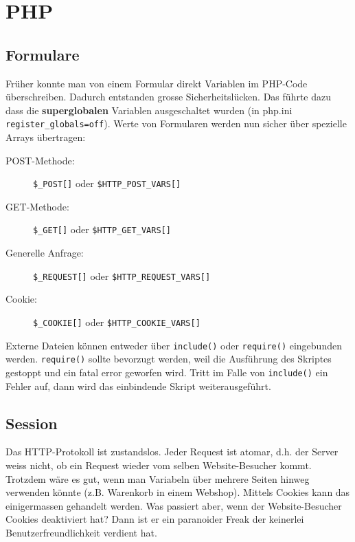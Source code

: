 \chapter{PHP}


\section{Formulare}

Früher konnte man von einem Formular direkt Variablen im PHP-Code überschreiben. Dadurch entstanden grosse Sicherheitslücken. Das führte dazu dass die \textbf{superglobalen} Variablen ausgeschaltet wurden (in php.ini \verb|register_globals=off|). Werte von Formularen werden nun sicher über spezielle Arrays übertragen:

\begin{description}
	\item[POST-Methode:] \verb|$_POST[]| oder \verb|$HTTP_POST_VARS[]|
	\item[GET-Methode:] \verb|$_GET[]| oder \verb|$HTTP_GET_VARS[]|
	\item[Generelle Anfrage:] \verb|$_REQUEST[]| oder \verb|$HTTP_REQUEST_VARS[]|
	\item[Cookie:] \verb|$_COOKIE[]| oder \verb|$HTTP_COOKIE_VARS[]|
\end{description}

Externe Dateien können entweder über \verb|include()| oder \verb|require()| eingebunden werden. \verb|require()| sollte bevorzugt werden, weil die Ausführung des Skriptes gestoppt und ein fatal error geworfen wird. Tritt im Falle von \verb|include()| ein Fehler auf, dann wird das einbindende Skript weiterausgeführt.

\section{Session}

Das HTTP-Protokoll ist zustandslos. Jeder Request ist atomar, d.h. der Server weiss nicht, ob ein Request wieder vom selben Website-Besucher kommt. Trotzdem wäre es gut, wenn man Variabeln über mehrere Seiten hinweg verwenden könnte (z.B. Warenkorb in einem Webshop). Mittels Cookies kann das einigermassen gehandelt werden. Was passiert aber, wenn der Website-Besucher Cookies deaktiviert hat? Dann ist er ein paranoider Freak der keinerlei Benutzerfreundlichkeit verdient hat.

